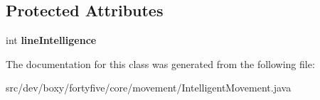 \subsection*{Protected Attributes}
\begin{DoxyCompactItemize}
\item 
\hypertarget{classdev_1_1boxy_1_1fortyfive_1_1core_1_1movement_1_1_intelligent_movement_aa9fbac60c8d4d59da53cc1ecbc247c35}{
int {\bfseries lineIntelligence}}
\label{d7/d04/classdev_1_1boxy_1_1fortyfive_1_1core_1_1movement_1_1_intelligent_movement_aa9fbac60c8d4d59da53cc1ecbc247c35}

\end{DoxyCompactItemize}


The documentation for this class was generated from the following file:\begin{DoxyCompactItemize}
\item 
src/dev/boxy/fortyfive/core/movement/IntelligentMovement.java\end{DoxyCompactItemize}
